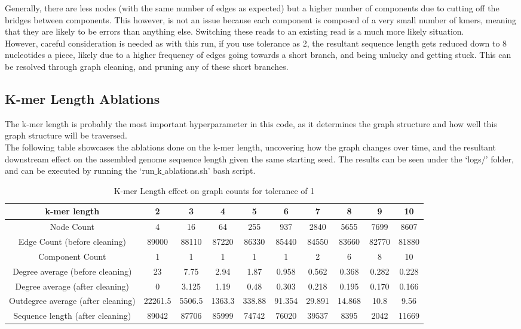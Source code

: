 \documentclass[10pt]{article}
\begin{document}
Generally, there are less nodes (with the same number of edges as expected) but a higher number of components due to cutting off the bridges between components. This however, is not an issue because each component is composed of a very small number of kmers, meaning that they are likely to be errors than anything else. Switching these reads to an existing read is a much more likely situation.\\

However, careful consideration is needed as with this run, if you use tolerance as 2, the resultant sequence length gets reduced down to 8 nucleotides a piece, likely due to a higher frequency of edges going towards a short branch, and being unlucky and getting stuck. This can be resolved through graph cleaning, and pruning any of these short branches.

\subsection*{K-mer Length Ablations}
The k-mer length is probably the most important hyperparameter in this code, as it determines the graph structure and how well this graph structure will be traversed.\\

The following table showcases the ablations done on the k-mer length, uncovering how the graph changes over time, and the resultant downstream effect on the assembled genome sequence length given the same starting seed. The results can be seen under the `logs/' folder, and can be executed by running the `run$\_$k$\_$ablations.sh' bash script.
\begin{table}[h]
\centering
\begin{tabular}{c|ccccccccc}
k-mer length & 2 & 3 & 4 & 5 & 6 & 7 & 8 & 9 & 10 \\ \hline
Node Count & 4 & 16 & 64 & 255 & 937 & 2840 & 5655 & 7699 & 8607\\
\hline
Edge Count (before cleaning) & 89000 & 88110 & 87220 & 86330 & 85440 & 84550 & 83660 & 82770 & 81880 \\
\hline
Component Count & 1 & 1 & 1 & 1 & 1 & 2 & 6 & 8 & 10\\
\hline
Degree average (before cleaning) & 23 & 7.75 & 2.94 & 1.87 & 0.958 & 0.562 & 0.368 & 0.282 & 0.228\\
\hline
Degree average (after cleaning) & 0 & 3.125 & 1.19 & 0.48 & 0.303 & 0.218 & 0.195 & 0.170 & 0.166 \\
\hline
Outdegree average (after cleaning) & 22261.5 & 5506.5 & 1363.3 & 338.88 & 91.354 & 29.891 & 14.868 & 10.8 & 9.56 \\
\hline
Sequence length (after cleaning) & 89042 & 87706 & 85999 & 74742 & 76020 & 39537 & 8395 & 2042 & 11669
\end{tabular}
\caption{K-mer Length effect on graph counts for tolerance of 1}
\end{table}
\end{document}
